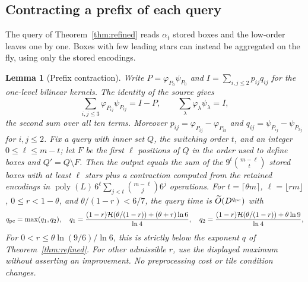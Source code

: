 \documentclass[11pt]{article}
\newtheorem{lemma}[theorem]{Lemma}
\newcommand{\softO}{\widetilde O}
\newcommand{\HH}{\mathcal H}
\begin{document}
\subsection*{Contracting a prefix of each query}
The query of Theorem~\ref{thm:refined} reads $\alpha_t$ stored boxes and the
low-order leaves one by one. Boxes with few leading stars can instead be
aggregated on the fly, using only the stored encodings.

\begin{lemma}[Prefix contraction]
\label{lem:prefix}
Write $P=\varphi_{P_0}\psi_{P_0}$ and $I=\sum_{i,j\le2}p_{ij}q_{ij}$ for the
one-level bilinear kernels. The identity of the source gives
\[
\sum_{i,j\le3}\varphi_{P_{ij}}\psi_{P_{ij}}=I-P,\qquad
\sum_{\lambda}\varphi_\lambda\psi_\lambda=I,
\]
the second sum over all ten terms. Moreover $p_{ij}=\varphi_{P_{ij}}-\varphi_{P_{i3}}$
and $q_{ij}=\psi_{P_{ij}}-\psi_{P_{3j}}$ for $i,j\le2$. Fix a query with
inner set $Q$, the switching order $t$, and an integer $0\le\ell\le m-t$;
let $F$ be the first $\ell$ positions of $Q$ in the order used to define
boxes and $Q'=Q\setminus F$. Then the output equals the sum of the
$9^t\binom{m-\ell}t$ stored boxes with at least $\ell$ stars plus a
contraction computed from the retained encodings in
$\operatorname{poly}(L)\,6^\ell\sum_{j<t}\binom{m-\ell}j6^j$ operations.
For $t=\lceil\theta m\rceil$, $\ell=\lfloor rm\rfloor$, $0\le r<1-\theta$,
and $\theta/(1-r)<6/7$, the query time is $\softO(D^{q_{\rm pc}})$ with
\[
q_{\rm pc}=\max(q_1,q_2),\quad
q_1=\frac{(1-r)\HH(\theta/(1-r))+(\theta+r)\ln6}{\ln4},\quad
q_2=\frac{(1-r)\HH(\theta/(1-r))+\theta\ln9}{\ln4},
\]
For $0<r\le\theta\ln(9/6)/\ln6$, this is strictly below the
exponent $q$ of Theorem~\ref{thm:refined}. For other admissible $r$,
use the displayed maximum without asserting an improvement.
No preprocessing cost or tile condition changes.
\end{lemma}
\end{document}
